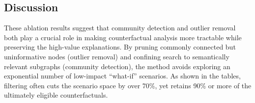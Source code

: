 \begin{table}[htbp]
    \centering
    \caption{Results for User 2}
    \label{tab:ablation_user2}
\end{table}

\FloatBarrier

\begin{table}[htbp]
    \centering
    \caption{Results for User 3}
    \label{tab:ablation_user3}
\end{table}

\FloatBarrier

\begin{table}[htbp]
    \centering
    \caption{Results for User 4}
    \label{tab:ablation_user4}
\end{table}


\subsection{Discussion}

These ablation results suggest that community detection and outlier removal both
play a crucial role in making counterfactual analysis more tractable while
preserving the high-value explanations. By pruning commonly connected but uninformative
nodes (outlier removal) and confining search to semantically relevant subgraphs (community
detection), the method avoids exploring an exponential number of low-impact
“what-if” scenarios. As shown in the tables, filtering often cuts the scenario
space by over 70\%, yet retains 90\% or more of the ultimately eligible counterfactuals.

